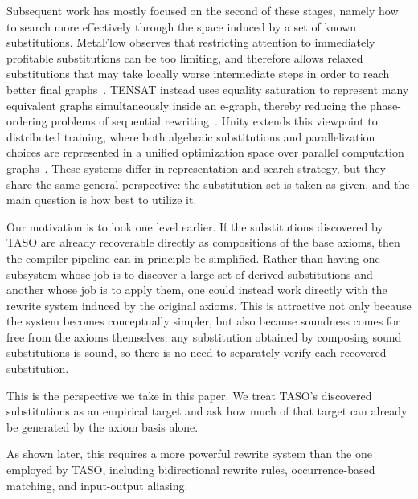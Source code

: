\documentclass[sigplan,10pt,nonacm]{acmart}
\begin{document}
Subsequent work has mostly focused on the second of these stages, namely how to search more effectively through the space induced by a set of known substitutions. MetaFlow observes that restricting attention to immediately profitable substitutions can be too limiting, and therefore allows relaxed substitutions that may take locally worse intermediate steps in order to reach better final graphs~\cite{jia2019relaxed}. TENSAT instead uses equality saturation to represent many equivalent graphs simultaneously inside an e-graph, thereby reducing the phase-ordering problems of sequential rewriting~\cite{yang2021equality,willsey2021egg}. Unity extends this viewpoint to distributed training, where both algebraic substitutions and parallelization choices are represented in a unified optimization space over parallel computation graphs~\cite{unger2022unity}. These systems differ in representation and search strategy, but they share the same general perspective: the substitution set is taken as given, and the main question is how best to utilize it.

Our motivation is to look one level earlier. If the substitutions discovered by TASO are already recoverable directly as compositions of the base axioms, then the compiler pipeline can in principle be simplified. Rather than having one subsystem whose job is to discover a large set of derived substitutions and another whose job is to apply them, one could instead work directly with the rewrite system induced by the original axioms. This is attractive not only because the system becomes conceptually simpler, but also because soundness comes for free from the axioms themselves: any substitution obtained by composing sound substitutions is sound, so there is no need to separately verify each recovered substitution. 

This is the perspective we take in this paper. We treat TASO's discovered substitutions as an empirical target and ask how much of that target can already be generated by the axiom basis alone. 

As shown later, this requires a more powerful rewrite system than the one employed by TASO, including bidirectional rewrite rules, occurrence-based matching, and input-output aliasing.

\end{document}
